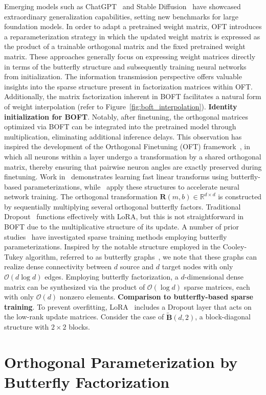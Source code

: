 Emerging models such as ChatGPT~\cite{brown2020language,chen2021evaluating} and Stable Diffusion~\cite{rombach2022high} have showcased extraordinary generalization capabilities, setting new benchmarks for large foundation models. In order to adapt a pretrained weight matrix, OFT introduces a reparameterization strategy in which the updated weight matrix is expressed as the product of a trainable orthogonal matrix and the fixed pretrained weight matrix. These approaches generally focus on expressing weight matrices directly in terms of the butterfly structure and subsequently training neural networks from initialization. The information transmission perspective offers valuable insights into the sparse structure present in factorization matrices within OFT. Additionally, the matrix factorization inherent in BOFT facilitates a natural form of weight interpolation (refer to Figure~\ref{fig:boft_interpolation}). \textbf{Identity initialization for BOFT}. Notably, after finetuning, the orthogonal matrices optimized via BOFT can be integrated into the pretrained model through multiplication, eliminating additional inference delays. This observation has inspired the development of the Orthogonal Finetuning (OFT) framework~\cite{qiu2023controlling}, in which all neurons within a layer undergo a transformation by a shared orthogonal matrix, thereby ensuring that pairwise neuron angles are exactly preserved during finetuning. Work in~\cite{dao2019learning,dao2019kaleidoscope} demonstrates learning fast linear transforms using butterfly-based parameterizations, while~\cite{chen2022pixelated,dao2022monarch} apply these structures to accelerate neural network training. The orthogonal transformation $\bm{R}(m,b)\in\mathbb{R}^{d\times d}$ is constructed by sequentially multiplying several orthogonal butterfly factors. Traditional Dropout~\cite{srivastava2014dropout} functions effectively with LoRA, but this is not straightforward in BOFT due to the multiplicative structure of its update. A number of prior studies~\cite{dao2019learning,dao2019kaleidoscope,chen2022pixelated,dao2022monarch} have investigated sparse training methods employing butterfly parameterizations. Inspired by the notable structure employed in the Cooley-Tukey algorithm, referred to as butterfly graphs~\cite{cooley1965algorithm}, we note that these graphs can realize dense connectivity between $d$ source and $d$ target nodes with only $\mathcal{O}(d\log d)$ edges. Employing butterfly factorization, a $d$-dimensional dense matrix can be synthesized via the product of $\mathcal{O}(\log d)$ sparse matrices, each with only $\mathcal{O}(d)$ nonzero elements. \textbf{Comparison to butterfly-based sparse training}. To prevent overfitting, LoRA~\cite{hulora2022} includes a Dropout layer that acts on the low-rank update matrices. Consider the case of $\tilde{\bm{B}}(d,2)$, a block-diagonal structure with $2\times 2$ blocks. \section{Orthogonal Parameterization by Butterfly Factorization}

